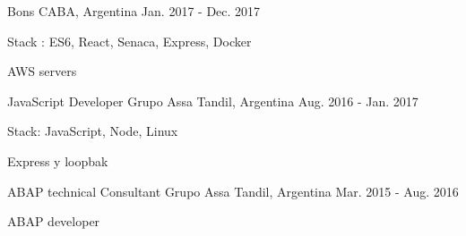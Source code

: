 \begin{cventries}
{Bons} %
{CABA, Argentina} %
{Jan. 2017 - Dec. 2017} %
{ %
\begin{cvitems}
\item {Stack : ES6, React, Senaca, Express, Docker}
\item {AWS servers}
\end{cvitems}
}
\cventry
{JavaScript Developer} %
{Grupo Assa} %
{Tandil, Argentina} %
{Aug. 2016 - Jan. 2017} %
{ %
\begin{cvitems}
\item {Stack: JavaScript, Node, Linux}
\item {Express y loopbak}
\end{cvitems}
}

\cventry
{ABAP technical Consultant} %
{Grupo Assa} %
{Tandil, Argentina} %
{Mar. 2015 - Aug. 2016} %
{ %
\begin{cvitems}
\item {ABAP developer}
\end{cvitems}
}

\end{cventries}

